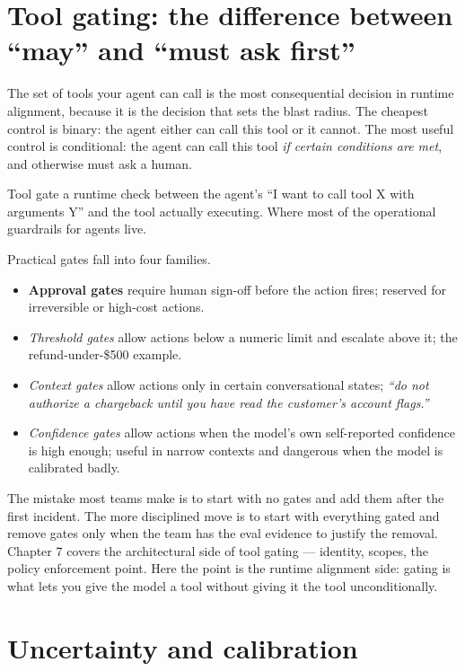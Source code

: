 \section{Tool gating: the difference between ``may'' and ``must ask first''}

The set of tools your agent can call is the most consequential decision in runtime alignment, because it is the decision that sets the blast radius. The cheapest control is binary: the agent either can call this tool or it cannot. The most useful control is conditional: the agent can call this tool \textit{if certain conditions are met}, and otherwise must ask a human.

\begin{TNdefinition}{Tool gate} a runtime check between the agent's ``I want to call tool X with arguments Y'' and the tool actually executing. Where most of the operational guardrails for agents live. \end{TNdefinition}

Practical gates fall into four families.

\begin{itemize}
\item \textbf{Approval gates} require human sign-off before the action fires; reserved for irreversible or high-cost actions.
\item \textit{Threshold gates} allow actions below a numeric limit and escalate above it; the refund-under-\$500 example.
\item \textit{Context gates} allow actions only in certain conversational states; \textit{``do not authorize a chargeback until you have read the customer's account flags.''}
\item \textit{Confidence gates} allow actions when the model's own self-reported confidence is high enough; useful in narrow contexts and dangerous when the model is calibrated badly.
\end{itemize}

The mistake most teams make is to start with no gates and add them after the first incident. The more disciplined move is to start with everything gated and remove gates only when the team has the eval evidence to justify the removal. Chapter 7 covers the architectural side of tool gating --- identity, scopes, the policy enforcement point. Here the point is the runtime alignment side: gating is what lets you give the model a tool without giving it the tool unconditionally.

\section{Uncertainty and calibration}

